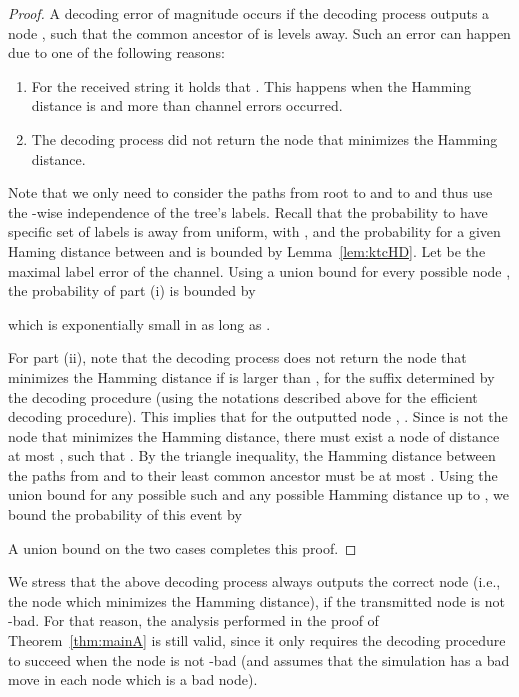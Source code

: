 \documentclass[ letterpaper, 11pt]{article}
\begin{document}
\begin{proof}
A decoding error of magnitude  occurs if the decoding process outputs a node
 , such that the common ancestor of  is  levels away.
Such an error can happen due to one of the following reasons:
\begin{enumerate}
\renewcommand{\labelenumi}{(\roman{enumi})}
\setlength{\itemsep}{1pt}
\vspace{-0.3em}
\item For the received string  it holds that
. This happens when
the Hamming distance  is  and more than  channel errors  occurred.
\item The decoding process did not return the node that minimizes the Hamming distance.
\end{enumerate}
Note that we only need to consider the paths from root to  and to  and thus use the -wise independence of the tree's labels.
Recall that the probability to have specific set of  labels is  away from uniform, with , and the probability for a given Haming distance between  and  is bounded by Lemma~\ref{lem:ktcHD}.
Let  be the maximal label error of the channel.
Using a union bound for every possible node ,
the probability of part (i) is bounded by

which is exponentially small in  as long as .


For part (ii),
note that the decoding process does not return the node that minimizes the Hamming
distance if
 is larger than , for the suffix determined by the decoding procedure
(using the notations described above for the efficient decoding procedure).
This implies that for the outputted node , .
Since  is not the node that minimizes the Hamming distance,
there must exist a node 
of distance at most ,
such that .
By the triangle inequality, the Hamming distance between the paths from
  and   to
 their least common ancestor
must be at most .
Using the union bound for any possible such  and any possible Hamming distance up to ,
we bound the probability of this event by

A union bound on the two cases completes this proof.
\end{proof}

We stress that the above decoding process always outputs the correct
node (i.e., the node which minimizes the Hamming distance), if the transmitted
node is not -bad. For that reason, the analysis performed
in the proof of  Theorem~\ref{thm:mainA} is still valid, since it
only requires the decoding procedure to succeed when the node is not -bad
(and assumes that the simulation has a bad move
in each node which is a bad node).
\end{document}
